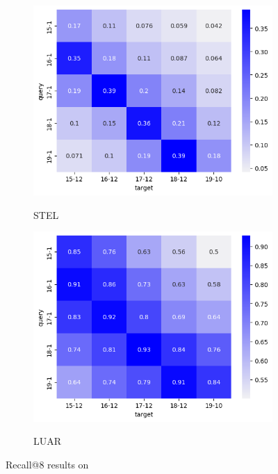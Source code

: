 \begin{figure}
    
    \begin{subfigure}{0.48\linewidth}
    \includegraphics[width=\linewidth,alt={Heatmap for STEL.}]{stylometryExtensions/figures/heat/stel.png}
    \caption{STEL}
    \label{fig:tempral_vary:stel}
    \end{subfigure}
    \begin{subfigure}{0.48\linewidth}
    \includegraphics[width=\linewidth,alt={Heatmap for LUAR.}]{stylometryExtensions/figures/heat/luar.png}
    \caption{LUAR}
    \label{fig:tempral_vary:LUAR}
    \end{subfigure}

    \caption{Recall@8 results on \DSvarydelta{}}
    \label{fig:temporal_vary}
\end{figure}

